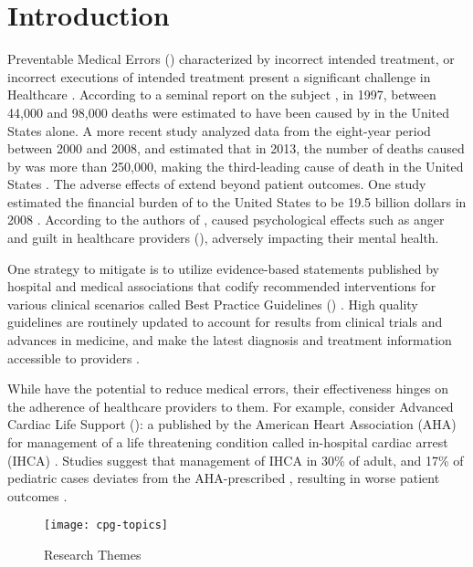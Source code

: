 \section{Introduction}\label{sec:introduction}

Preventable Medical Errors (\PMEs{}) characterized by
incorrect intended treatment, or incorrect executions of intended
treatment present a significant challenge in Healthcare
\cite{RodziewiczStatsPearls18}. According to a seminal report on the subject
\cite{DonaldsonBook00}, in 1997,
between 44,000 and 98,000 deaths were estimated to have been caused by \PMEs{} in
the United States alone. A more recent study analyzed data from the eight-year
period between 2000 and 2008, and estimated that in 2013, the number of deaths
caused by \PMEs{} was more than 250,000, making \PMEs{} the third-leading
cause of death in the United States \cite{MakaryBMJ16}.
The adverse effects of \PMEs{} extend beyond patient outcomes.
One study estimated the financial burden of \PMEs{} to the United States to be
19.5 billion dollars in 2008 \cite{AndelJHCF12}. According to the authors of
\cite{RodziewiczStatsPearls18}, \PMEs{} caused psychological effects such
as anger and guilt in healthcare providers (\HCPs{}), adversely impacting their mental
health.

One strategy to mitigate \PMEs{} is to utilize evidence-based statements
published by hospital and medical associations that codify recommended
interventions for various clinical scenarios called Best Practice Guidelines (\BPGs{})
\cite{field1990clinical}. High quality guidelines are routinely updated to account for
 results from clinical trials and advances in medicine, and make the latest
 diagnosis and treatment information accessible to providers \cite{SteinbergNAP11}.

While \BPGs{} have the potential to reduce medical errors, their effectiveness hinges
on the adherence of healthcare providers to them.
For example, consider Advanced Cardiac Life Support (\ACLS{}): a \BPG{} published
by the American Heart Association (AHA) for management
of a life threatening condition called in-hospital cardiac arrest (IHCA) \cite{AHAGuidelineAdult, AHAGuidelinePed}. Studies suggest that management
of IHCA in 30\% of adult, and 17\% of pediatric cases deviates from the
AHA-prescribed \BPG, resulting in worse patient outcomes \cite{Ornato2012DeviationAdult,Wolfe2020DeviationPediatric,
Crowley2020DeviationAdult,Honarmand2018Adherence,Mcevoy2014Adherence}.

\begin{wrapfigure}{l}{0.5\textwidth}
  \texttt{[image: cpg-topics]}
  \caption{\CDSSs{} Research Themes}\label{fig:cpg-research-topics}
\end{wrapfigure}

